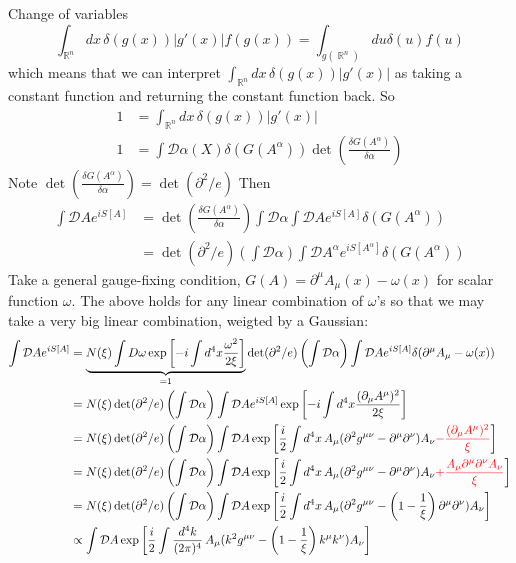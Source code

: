 \documentclass{report}
\theoremstyle{plain}
\theoremstyle{definition}
\theoremstyle{remark}
\newcommand{\FR}[2]{\frac{#1}{#2}}
\newcommand{\PFR}[2]{\left(\frac{#1}{#2}\right)}
\newcommand{\mc}{\mathcal}
\newcommand{\di}{\partial}
\newcommand{\colr}[1]{ {\color{red} #1 } }
\DeclareMathOperator{\bR}{\mathbb{R}}
\begin{document}
Change of variables
\[ \int_{\bR^n} dx\, \delta(g(x))|g'(x)|f(g(x)) = \int_{g(\bR^n)} du
\delta(u)f(u) \]
which means that we can interpret $\int_{\bR^n} dx\, \delta(g(x))|g'(x)|$
as taking a constant function and returning the constant function back. So 
\begin{align*}
1 &= \int_{\bR^n} dx\, \delta(g(x))|g'(x)|\\
1 &= \int \mc D\alpha(X) \delta(G(A^\alpha))
\det\PFR{\delta G(A^\alpha)}{\delta\alpha}
\end{align*}
Note $\det\PFR{\delta G(A^\alpha)}{\delta\alpha} = \det(\partial^2/e)$
Then \begin{align*}
    \int \mc DA e^{iS[A]}
&= \det\PFR{\delta G(A^\alpha)}{\delta\alpha}
\int \mc D\alpha\int \mc D A e^{iS[A]}\delta(G(A^\alpha))\\
&= 
\det(\partial^2/e) \left( \int\mc D\alpha \right)
\int \mc D A^\alpha e^{iS[A^\alpha]}\delta(G(A^\alpha))
\end{align*}
Take a general gauge-fixing condition, $G(A) = \di^\mu A_\mu(x) -
\omega(x)$ for scalar function $\omega$. The above holds for any linear
combination of $\omega$'s so that we may take a very big linear
combination, weigted by a Gaussian:
\begin{align*}
    \int \mc DA e^{iS[A]}
    &= \underbrace{N(\xi) \int D\omega \exp \left[ -i\int d^4x
    \FR{\omega^2}{2\xi} \right]}_{=1}
\det(\partial^2/e) \left( \int\mc D\alpha \right)
\int \mc D A e^{iS[A]}\delta(\di^\mu A_\mu - \omega(x))\\
&= N(\xi) \det(\partial^2/e) \left( \int\mc D\alpha \right)
\int \mc D A e^{iS[A]} \exp \left[ -i\int d^4x \FR{(\di_\mu A^\mu)^2}{2\xi}\right]\\
&= N(\xi) \det(\partial^2/e) \left( \int\mc D\alpha \right)
\int \mc D A \exp \left[ \FR{i}{2}\int d^4x\, A_\mu(\di^2g^{\mu\nu}- \di^\mu\di^\nu)A_\nu\colr{-\FR{(\di_\mu A^\mu)^2}{\xi}}\right]\\
&= N(\xi) \det(\partial^2/e) \left( \int\mc D\alpha \right)
\int \mc D A \exp \left[ \FR{i}{2}\int d^4x\, A_\mu(\di^2g^{\mu\nu}-\di^\mu\di^\nu)A_\nu\colr{+\FR{A_\mu\di^\mu\di^\nu A_\nu}{\xi}}\right]\\
&= N(\xi) \det(\partial^2/e) \left( \int\mc D\alpha \right)
\int \mc D A \exp \left[ \FR{i}{2}\int d^4x\, A_\mu(\di^2g^{\mu\nu}
-\left(1-\FR{1}{\xi}\right)\di^\mu\di^\nu)A_\nu\right]\\
&\propto
\int \mc D A \exp \left[ \FR{i}{2}\int \FR{d^4k}{(2\pi)^4}\,
A_\mu(k^2g^{\mu\nu}-\left(1-\FR{1}{\xi}\right)k^\mu k^\nu)A_\nu\right]\\
\end{align*}
\end{document}
